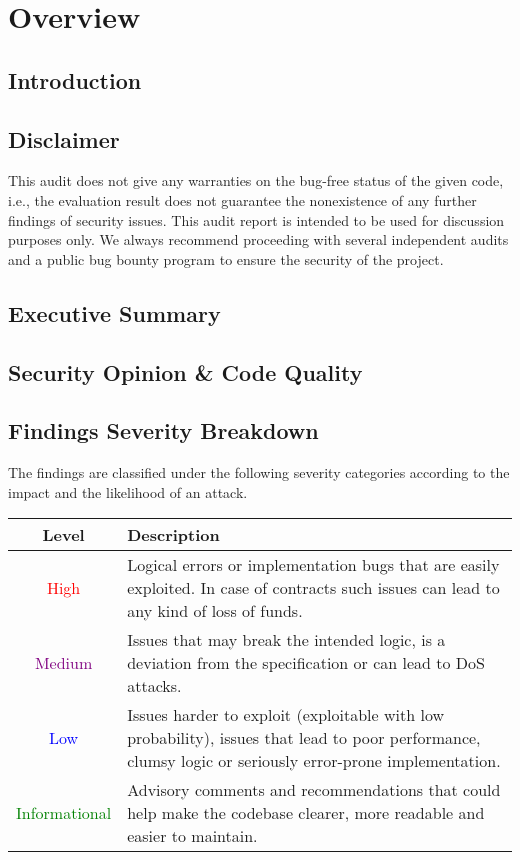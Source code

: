 \section{Overview}
\subsection{Introduction}
\subsection{Disclaimer}
This audit does not give any warranties on the bug-free status of the given code, i.e., the evaluation result does not guarantee the nonexistence of any further findings of security issues. This audit report is intended to be used for discussion purposes only. We always recommend proceeding with several independent audits and a public bug bounty program to ensure the security of the project.
\subsection{Executive Summary}
\subsection{Security Opinion \& Code Quality}
\subsection{Findings Severity Breakdown}
The findings are classified under the following severity categories according to the impact and the likelihood of an attack.

\begin{center}
\begin{tabular}{||c p{9cm}||} 
 \hline
 Level & Description \\ [0.5ex] 
 \hline\hline
 \textcolor{red}{High} & Logical errors or implementation bugs that are easily exploited. In case of contracts such issues can lead to any kind of loss of funds.\\
 \hline
 \textcolor{purple}{Medium} & Issues that may break the intended logic, is a deviation from the specification or can lead to DoS attacks.\\
 \hline
 \textcolor{blue}{Low} & Issues harder to exploit (exploitable with low probability), issues that lead to poor performance, clumsy logic or seriously error-prone implementation.\\
 \hline
 \textcolor{green}{Informational} & Advisory comments and recommendations that could help make the codebase clearer, more readable and easier to maintain.\\
 \hline
\end{tabular}
\end{center}


